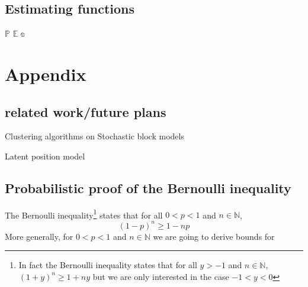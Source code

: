 \documentclass{article}
\begin{document}
\subsection{ Estimating functions }
$\mathbb{P}$
$\mathbb{E}$
$\mathbb{a}$


\section{Appendix}

\subsection{related work/future plans}


Clustering algorithms on Stochastic block models 

\cite{Oliviera}


\cite{Lei_2015}


\cite{Levina-Vershynin}

Latent position model

\cite{Bickel}

\cite{Tang}

\cite{Arias-Castro}

\cite{Chatterjee}

\subsection{Probabilistic proof of the Bernoulli inequality}

The Bernoulli inequality\footnote{In fact the Bernoulli inequality states that for all $y>-1$ and $n\in\mathbb{N}$, $(1+y)^n\geq 1+ny$ but we are only interested in the case $-1<y<0$} states that for all $0<p<1$ and $n\in\mathbb{N}$, 
\begin{equation}
\label{bern_ineq}
    (1-p)^n\geq 1-np
\end{equation}
More generally, for $0<p<1$ and $n\in\mathbb{N}$ we are going to derive bounds for
\end{document}
